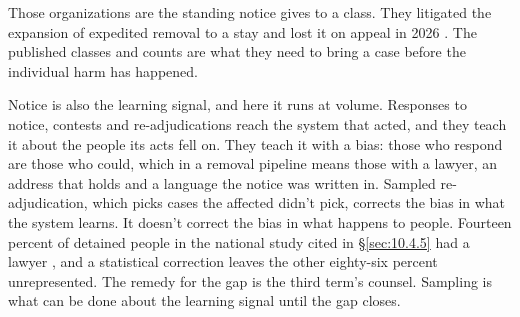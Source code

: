 Those organizations are the standing notice gives to a class. They litigated the expansion of expedited removal to a stay and lost it on appeal in 2026 \autocite{MontoyaGalvez2025Cobb,Knappenberger2026DCCir}. The published classes and counts are what they need to bring a case before the individual harm has happened.

Notice is also the learning signal, and here it runs at volume. Responses to notice, contests and re-adjudications reach the system that acted, and they teach it about the people its acts fell on. They teach it with a bias: those who respond are those who could, which in a removal pipeline means those with a lawyer, an address that holds and a language the notice was written in. Sampled re-adjudication, which picks cases the affected didn't pick, corrects the bias in what the system learns. It doesn't correct the bias in what happens to people. Fourteen percent of detained people in the national study cited in \S\ref{sec:10.4.5} had a lawyer \autocite{EaglyShafer2016Counsel}, and a statistical correction leaves the other eighty-six percent unrepresented. The remedy for the gap is the third term's counsel. Sampling is what can be done about the learning signal until the gap closes.
